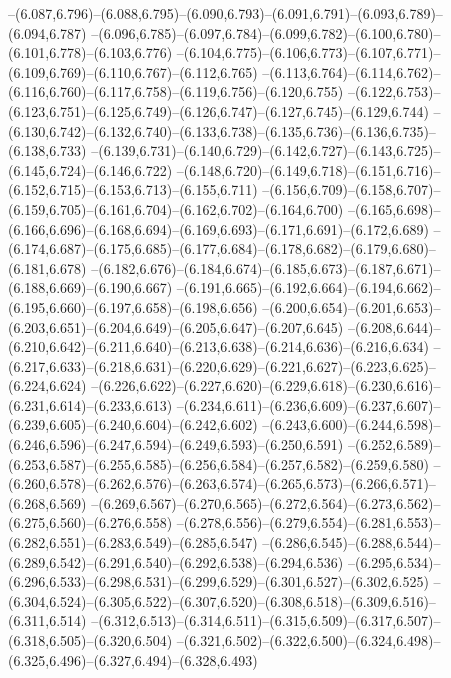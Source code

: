   --(6.087,6.796)--(6.088,6.795)--(6.090,6.793)--(6.091,6.791)--(6.093,6.789)--(6.094,6.787)%
  --(6.096,6.785)--(6.097,6.784)--(6.099,6.782)--(6.100,6.780)--(6.101,6.778)--(6.103,6.776)%
  --(6.104,6.775)--(6.106,6.773)--(6.107,6.771)--(6.109,6.769)--(6.110,6.767)--(6.112,6.765)%
  --(6.113,6.764)--(6.114,6.762)--(6.116,6.760)--(6.117,6.758)--(6.119,6.756)--(6.120,6.755)%
  --(6.122,6.753)--(6.123,6.751)--(6.125,6.749)--(6.126,6.747)--(6.127,6.745)--(6.129,6.744)%
  --(6.130,6.742)--(6.132,6.740)--(6.133,6.738)--(6.135,6.736)--(6.136,6.735)--(6.138,6.733)%
  --(6.139,6.731)--(6.140,6.729)--(6.142,6.727)--(6.143,6.725)--(6.145,6.724)--(6.146,6.722)%
  --(6.148,6.720)--(6.149,6.718)--(6.151,6.716)--(6.152,6.715)--(6.153,6.713)--(6.155,6.711)%
  --(6.156,6.709)--(6.158,6.707)--(6.159,6.705)--(6.161,6.704)--(6.162,6.702)--(6.164,6.700)%
  --(6.165,6.698)--(6.166,6.696)--(6.168,6.694)--(6.169,6.693)--(6.171,6.691)--(6.172,6.689)%
  --(6.174,6.687)--(6.175,6.685)--(6.177,6.684)--(6.178,6.682)--(6.179,6.680)--(6.181,6.678)%
  --(6.182,6.676)--(6.184,6.674)--(6.185,6.673)--(6.187,6.671)--(6.188,6.669)--(6.190,6.667)%
  --(6.191,6.665)--(6.192,6.664)--(6.194,6.662)--(6.195,6.660)--(6.197,6.658)--(6.198,6.656)%
  --(6.200,6.654)--(6.201,6.653)--(6.203,6.651)--(6.204,6.649)--(6.205,6.647)--(6.207,6.645)%
  --(6.208,6.644)--(6.210,6.642)--(6.211,6.640)--(6.213,6.638)--(6.214,6.636)--(6.216,6.634)%
  --(6.217,6.633)--(6.218,6.631)--(6.220,6.629)--(6.221,6.627)--(6.223,6.625)--(6.224,6.624)%
  --(6.226,6.622)--(6.227,6.620)--(6.229,6.618)--(6.230,6.616)--(6.231,6.614)--(6.233,6.613)%
  --(6.234,6.611)--(6.236,6.609)--(6.237,6.607)--(6.239,6.605)--(6.240,6.604)--(6.242,6.602)%
  --(6.243,6.600)--(6.244,6.598)--(6.246,6.596)--(6.247,6.594)--(6.249,6.593)--(6.250,6.591)%
  --(6.252,6.589)--(6.253,6.587)--(6.255,6.585)--(6.256,6.584)--(6.257,6.582)--(6.259,6.580)%
  --(6.260,6.578)--(6.262,6.576)--(6.263,6.574)--(6.265,6.573)--(6.266,6.571)--(6.268,6.569)%
  --(6.269,6.567)--(6.270,6.565)--(6.272,6.564)--(6.273,6.562)--(6.275,6.560)--(6.276,6.558)%
  --(6.278,6.556)--(6.279,6.554)--(6.281,6.553)--(6.282,6.551)--(6.283,6.549)--(6.285,6.547)%
  --(6.286,6.545)--(6.288,6.544)--(6.289,6.542)--(6.291,6.540)--(6.292,6.538)--(6.294,6.536)%
  --(6.295,6.534)--(6.296,6.533)--(6.298,6.531)--(6.299,6.529)--(6.301,6.527)--(6.302,6.525)%
  --(6.304,6.524)--(6.305,6.522)--(6.307,6.520)--(6.308,6.518)--(6.309,6.516)--(6.311,6.514)%
  --(6.312,6.513)--(6.314,6.511)--(6.315,6.509)--(6.317,6.507)--(6.318,6.505)--(6.320,6.504)%
  --(6.321,6.502)--(6.322,6.500)--(6.324,6.498)--(6.325,6.496)--(6.327,6.494)--(6.328,6.493)%
